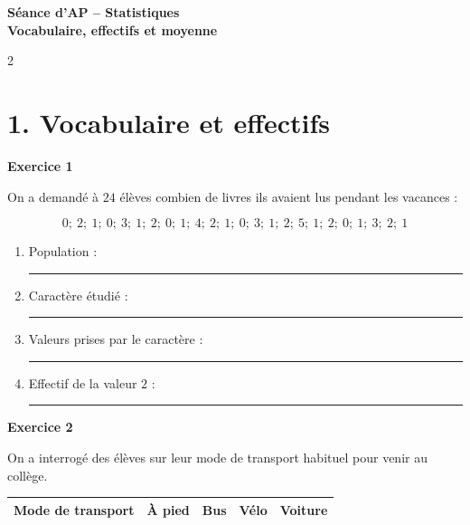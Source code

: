 \documentclass[11pt,a4paper,landscape]{article}
\newcommand{\soustitreexo}[1]{%
  {\sffamily\bfseries\color{TitreC}#1}\par
  \vspace{0.04em}
}
\newcommand{\reponse}[1][2.4cm]{%
  \rule{#1}{0.35pt}
}
\begin{document}
\begin{center}
  {\sffamily\LARGE\bfseries\color{TitreC}
  Séance d'AP -- Statistiques}\\[-0.05em]

  {\sffamily\normalsize\bfseries\color{SavoirC}
  Vocabulaire, effectifs et moyenne}
\end{center}

\vspace{-0.45em}

\begin{multicols*}{2}


\section*{1. Vocabulaire et effectifs}

\soustitreexo{Exercice 1}

On a demandé à \(24\) élèves combien de livres ils avaient lus
pendant les vacances :

\[
0;\ 2;\ 1;\ 0;\ 3;\ 1;\ 2;\ 0;\ 1;\ 4;\ 2;\ 1;\
0;\ 3;\ 1;\ 2;\ 5;\ 1;\ 2;\ 0;\ 1;\ 3;\ 2;\ 1
\]

\begin{enumerate}[label=\alph*)]

  \item Population :
  \reponse[4.2cm]

  \item Caractère étudié :
  \reponse[3.4cm]

  \item Valeurs prises par le caractère :
  \reponse[3.1cm]

  \item Effectif de la valeur \(2\) :
  \reponse[1.8cm]

\end{enumerate}


\soustitreexo{Exercice 2}

On a interrogé des élèves sur leur mode de transport habituel
pour venir au collège.

\begin{center}

\renewcommand{\arraystretch}{1.12}

\begin{tabular}{|c|c|c|c|c|}
\hline

Mode de transport
& À pied
& Bus
& Vélo
& Voiture
\\
\hline


\end{tabular}
\end{center}
\end{multicols*}
\end{document}
